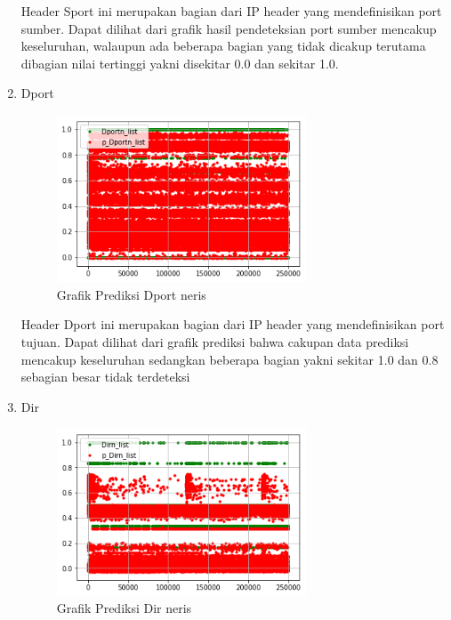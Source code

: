 \documentclass[./skripsi.tex]{subfiles}
\begin{document}
\begin{enumerate}
    \par Header Sport ini merupakan bagian dari IP header yang mendefinisikan port sumber. Dapat dilihat dari grafik hasil pendeteksian port sumber mencakup keseluruhan, walaupun ada beberapa bagian yang tidak dicakup terutama dibagian nilai tertinggi yakni disekitar 0.0 dan sekitar 1.0.
    
    \item Dport
    \begin{figure}%
        \centering
        \includegraphics[width=0.7\textwidth]{public/assets/img/lstmm_neris_pred5.png}
        \caption{Grafik Prediksi Dport neris}
        \label{fig:lstmm_neris_pred5}
    \end{figure}
    
    \par Header Dport ini merupakan bagian dari IP header yang mendefinisikan port tujuan. Dapat dilihat dari grafik prediksi bahwa cakupan data prediksi mencakup keseluruhan sedangkan beberapa bagian yakni sekitar 1.0 dan 0.8 sebagian besar tidak terdeteksi
    
    \item Dir
    \begin{figure}%
        \centering
        \includegraphics[width=0.7\textwidth]{public/assets/img/lstmm_neris_pred6.png}
        \caption{Grafik Prediksi Dir neris}
        \label{fig:lstmm_neris_pred6}
    \end{figure}
    

\end{enumerate}
\end{document}
